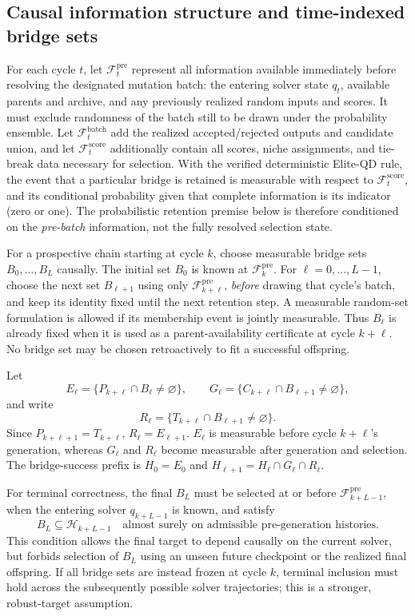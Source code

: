 \subsection{Causal information structure and time-indexed bridge sets}
For each cycle $t$, let $\mathcal F_t^{\mathrm{pre}}$ represent all information
available immediately before resolving the designated mutation batch: the
entering solver state $q_t$, available parents and archive, and any previously
realized random inputs and scores. It must exclude randomness of the batch
still to be drawn under the probability ensemble. Let
$\mathcal F_t^{\mathrm{batch}}$ add the realized accepted/rejected outputs and
candidate union, and let $\mathcal F_t^{\mathrm{score}}$ additionally contain
all scores, niche assignments, and tie-break data necessary for selection.
With the verified deterministic Elite-QD rule, the event that a particular
bridge is retained is measurable with respect to
$\mathcal F_t^{\mathrm{score}}$, and its conditional probability given that
complete information is its indicator (zero or one).
The probabilistic retention premise below is therefore conditioned on the
\emph{pre-batch} information, not the fully resolved selection state.

For a prospective chain starting at cycle $k$, choose measurable bridge sets
$B_0,\ldots,B_L$ causally. The initial set $B_0$ is known at
$\mathcal F_k^{\mathrm{pre}}$. For $\ell=0,\ldots,L-1$, choose the next
set $B_{\ell+1}$ using only $\mathcal F_{k+\ell}^{\mathrm{pre}}$,
\emph{before} drawing that cycle's batch, and keep its identity fixed until
the next retention step. A measurable random-set formulation is allowed if
its membership event is jointly measurable. Thus $B_\ell$ is already fixed
when it is used as a parent-availability certificate at cycle $k+\ell$.
No bridge set may be chosen retroactively to fit a successful offspring.

Let
\[
 E_\ell=\{P_{k+\ell}\cap B_\ell\neq\varnothing\},\qquad
 G_\ell=\{C_{k+\ell}\cap B_{\ell+1}\neq\varnothing\},
\]
and write
\[
 R_\ell=\{T_{k+\ell}\cap B_{\ell+1}\neq\varnothing\}.
\]
Since $P_{k+\ell+1}=T_{k+\ell}$, $R_\ell=E_{\ell+1}$.
$E_\ell$ is measurable before cycle $k+\ell$'s generation, whereas
$G_\ell$ and $R_\ell$ become measurable after generation and selection.
The bridge-success prefix is $H_0=E_0$ and
$H_{\ell+1}=H_\ell\cap G_\ell\cap R_\ell$.

For terminal correctness, the final $B_L$ must be selected at or before
$\mathcal F_{k+L-1}^{\mathrm{pre}}$, when the entering solver
$q_{k+L-1}$ is known, and satisfy
\[
 B_L\subseteq\mathcal H_{k+L-1}
 \quad\text{almost surely on admissible pre-generation histories}.
\]
This condition allows the final target to depend causally on the current
solver, but forbids selection of $B_L$ using an unseen future checkpoint or
the realized final offspring. If all bridge sets are instead frozen at
cycle $k$, terminal inclusion must hold across the subsequently possible
solver trajectories; this is a stronger, robust-target assumption.

